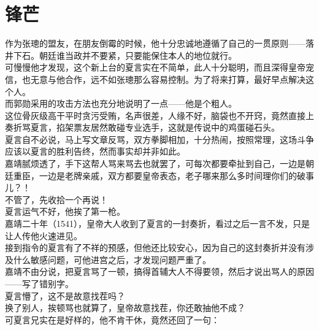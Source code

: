 \section{锋芒}
\ifnum{}
	\begin{multicols}{\theparacolNo}
\fi
作为张璁的盟友，在朋友倒霉的时候，他十分忠诚地遵循了自己的一贯原则——落井下石。朝廷谁当政并不要紧，只要能保住本人的地位就行。\\

可慢慢他才发现，这个新上台的夏言实在不简单，此人十分聪明，而且深得皇帝宠信，也无意与他合作，远不如张璁那么容易控制。为了将来打算，最好早点解决这个人。\\

而郭勋采用的攻击方法也充分地说明了一点——他是个粗人。\\

这位骨灰级高干平时贪污受贿，名声很差，人缘不好，脑袋也不开窍，竟然直接上奏折骂夏言，掐架票友居然敢碰专业选手，这就是传说中的鸡蛋碰石头。\\

夏言自不必说，马上写文章反骂，双方拳脚相加，十分热闹，按照常理，这场斗争应该以夏言的胜利告终，然而事实却并非如此。\\

嘉靖腻烦透了，手下这帮人骂来骂去也就罢了，可每次都要牵扯到自己，一边是朝廷重臣，一边是老牌亲戚，双方都要皇帝表态，老子哪来那么多时间理你们的破事儿？！\\

不管了，先收拾一个再说！\\

夏言运气不好，他挨了第一枪。\\

嘉靖二十年（1541），皇帝大人收到了夏言的一封奏折，看过之后一言不发，只是让人传他火速进见。\\

接到指令的夏言有了不祥的预感，但他还比较安心，因为自己的这封奏折并没有涉及什么敏感问题，可他进宫之后，才发现问题严重了。\\

嘉靖不由分说，把夏言骂了一顿，搞得首辅大人不得要领，然后才说出骂人的原因——写了错别字。\\

夏言懵了，这不是故意找茬吗？\\

换了别人，挨顿骂也就算了，皇帝故意找茬，你还敢抽他不成？\\

可夏言兄实在是好样的，他不肯干休，竟然还回了一句：\\


\end{multicols}
